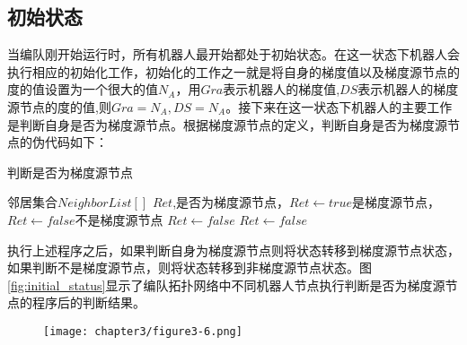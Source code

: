 \subsection{初始状态}
当编队刚开始运行时，所有机器人最开始都处于初始状态。在这一状态下机器人会执行相应的初始化工作，初始化的工作之一就是将自身的梯度值以及梯度源节点的度的值设置为一个很大的值$N_A$，用$Gra$表示机器人的梯度值,$DS$表示机器人的梯度源节点的度的值,则$Gra=N_A, DS=N_A$。接下来在这一状态下机器人的主要工作是判断自身是否为梯度源节点。根据梯度源节点的定义，判断自身是否为梯度源节点的伪代码如下：\\
\begin{algorithm}
	\caption{判断是否为梯度源节点}
	\label{IsSourceNode}
	\begin{algorithmic}[1]
		\Require 邻居集合$NeighborList[]$
		\Ensure $Ret$,是否为梯度源节点，$Ret \leftarrow true$是梯度源节点，$Ret \leftarrow false$不是梯度源节点
			\State $Ret \gets false$
					\State $Ret \gets false$
				\EndIf
			\EndFor 
			\State {}
		\EndFunction
	\end{algorithmic}	
\end{algorithm}
执行上述程序之后，如果判断自身为梯度源节点则将状态转移到梯度源节点状态，如果判断不是梯度源节点，则将状态转移到非梯度源节点状态。图\ref{fig:initial_status}显示了编队拓扑网络中不同机器人节点执行判断是否为梯度源节点的程序后的判断结果。
\begin{figure}[!htbp]
	\centering
	\texttt{[image: chapter3/figure3-6.png]}
\end{figure}

